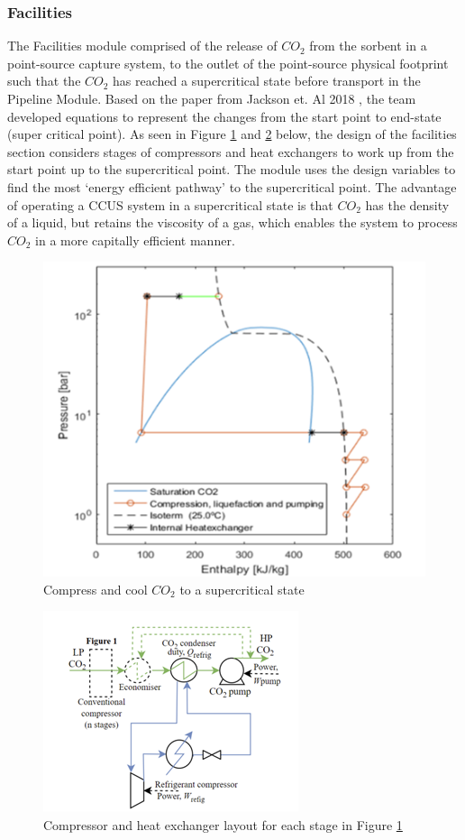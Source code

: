 \documentclass[balance,upint,subscriptcorrection,varvw,mathalfa=cal=boondoxo,spanish,french,vietnamese,russian,greek,pdf-a,colorlinks]{asmeconf}
\begin{document}
\subsubsection{Facilities}
The Facilities module comprised of the release of \begin{math}{CO_2} \end{math} from the sorbent in a point-source capture system, to the outlet of the point-source physical footprint such that the \begin{math}{CO_2} \end{math} has reached a supercritical state before transport in the Pipeline Module. 
Based on the paper from Jackson et. Al 2018 \cite{jackson_2018}, the team developed equations to represent the changes from the start point to end-state (super critical point). As seen in Figure \ref{enthalpy_diagram:1} and \ref{comphx:1} below, the design of the facilities section considers stages of compressors and heat exchangers to work up from the start point up to the supercritical point. The module uses the design variables to find the most ‘energy efficient pathway’ to the supercritical point. The advantage of operating a CCUS system in a supercritical state is that \begin{math}{CO_2} \end{math} has the density of a liquid, but retains the viscosity of a gas, which enables the system to process \begin{math}{CO_2} \end{math} in a more capitally efficient manner. 

\begin{figure}[h!t]
\centering\includegraphics[width=0.25\linewidth]{images/enthalpy_diagram.png}
\caption{Compress and cool \begin{math}{CO_2} \end{math} to a supercritical state}\label{enthalpy_diagram:1}
\end{figure}

\begin{figure}[h!t]
\centering\includegraphics[width=0.25\linewidth]{images/compression-hx.png}
\caption{Compressor and heat exchanger layout for each stage in Figure \ref{enthalpy_diagram:1}}\label{comphx:1}
\end{figure}
\end{document}
